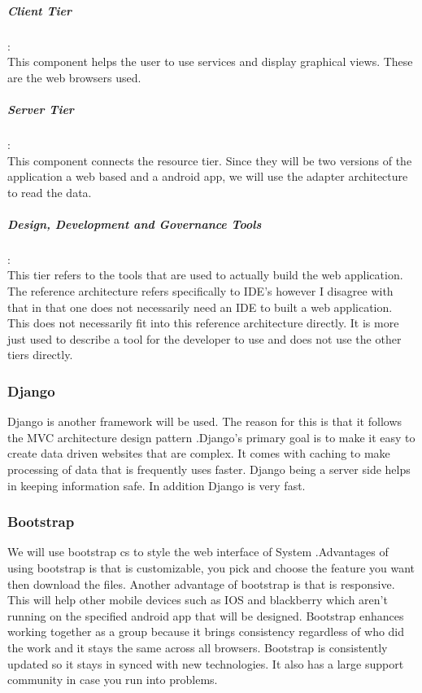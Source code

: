 \documentclass[a4paper,12pt]{article}
\begin{document}
\subparagraph{Client Tier}\hspace{-10pt}:\\
This component helps the user to use services and display graphical views. These are the web browsers used.

\subparagraph{Server Tier}\hspace{-10pt}:\\
This component connects the resource tier. Since they will be two versions of the application a web based and a android app, we will use the adapter architecture to read the data.


\subparagraph{Design, Development and Governance Tools}\hspace{-10pt}:\\
This tier refers to the tools that are used to actually build the web application. The reference architecture refers specifically to IDE's however I disagree with that in that one does not necessarily need an IDE to built a web application. This does not necessarily fit into this reference architecture directly. It is more just used to describe a tool for the developer to use and does not use the other tiers directly.
\subsubsection{Django}Django is another framework will be used. The reason for this is that it follows the MVC architecture design pattern .Django’s primary goal is to make it easy to create data driven websites that are complex. It comes with caching to make processing of data that is frequently uses faster. Django being a server side helps in keeping information safe. In addition Django is very fast.
\subsubsection{Bootstrap}We will use bootstrap cs to style the web interface of System .Advantages of using bootstrap  is that is customizable, you pick and choose the feature you want then download the files. Another advantage of bootstrap is that is responsive. This will help other mobile devices such as IOS and blackberry which aren’t running on the specified android app that will be designed. Bootstrap enhances working together as a group because it brings consistency regardless of who did the work and it stays the same across all browsers. Bootstrap is consistently updated so it stays in synced with new technologies. It also has a large support community in case you run into problems.\par 
\end{document}
